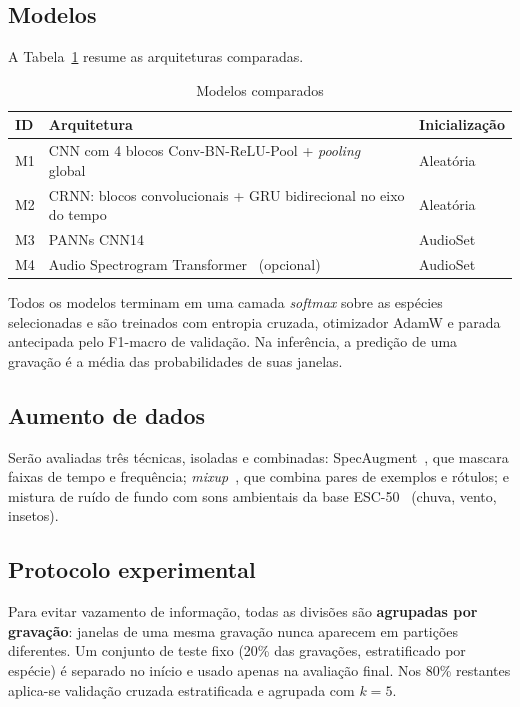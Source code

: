 \documentclass[conference]{IEEEtran}
\begin{document}
\subsection{Modelos}
A Tabela~\ref{tab:modelos} resume as arquiteturas comparadas.

\begin{table}[htbp]
\caption{Modelos comparados}
\label{tab:modelos}
\centering
\footnotesize
\begin{tabular}{@{}l>{\raggedright\arraybackslash}p{3.3cm}l@{}}
\toprule
\textbf{ID} & \textbf{Arquitetura} & \textbf{Inicialização} \\
\midrule
M1 & CNN com 4 blocos Conv-BN-ReLU-Pool + \textit{pooling} global~\cite{hershey2017} & Aleatória \\
M2 & CRNN: blocos convolucionais + GRU bidirecional no eixo do tempo~\cite{choi2017crnn} & Aleatória \\
M3 & PANNs CNN14~\cite{kong2020panns} & AudioSet \\
M4 & Audio Spectrogram Transformer~\cite{gong2021ast} (opcional) & AudioSet \\
\bottomrule
\end{tabular}
\end{table}

Todos os modelos terminam em uma camada \textit{softmax} sobre as espécies selecionadas e são treinados com entropia cruzada, otimizador AdamW e parada antecipada pelo F1-macro de validação. Na inferência, a predição de uma gravação é a média das probabilidades de suas janelas.

\subsection{Aumento de dados}
Serão avaliadas três técnicas, isoladas e combinadas: SpecAugment~\cite{park2019specaugment}, que mascara faixas de tempo e frequência; \textit{mixup}~\cite{zhang2018mixup}, que combina pares de exemplos e rótulos; e mistura de ruído de fundo com sons ambientais da base ESC-50~\cite{piczak2015esc} (chuva, vento, insetos).

\subsection{Protocolo experimental}
Para evitar vazamento de informação, todas as divisões são \textbf{agrupadas por gravação}: janelas de uma mesma gravação nunca aparecem em partições diferentes. Um conjunto de teste fixo (20\% das gravações, estratificado por espécie) é separado no início e usado apenas na avaliação final. Nos 80\% restantes aplica-se validação cruzada estratificada e agrupada com $k=5$.
\end{document}
